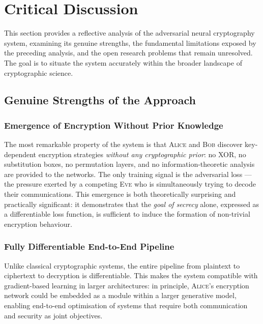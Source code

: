 \documentclass[12pt, a4paper]{article}
\newcommand{\alice}{\textsc{Alice}}
\newcommand{\bob}{\textsc{Bob}}
\newcommand{\eve}{\textsc{Eve}}
\begin{document}
\newpage
\section{Critical Discussion}
\label{sec:discussion}

This section provides a reflective analysis of the adversarial neural
cryptography system, examining its genuine strengths, the fundamental
limitations exposed by the preceding analysis, and the open research
problems that remain unresolved. The goal is to situate the system
accurately within the broader landscape of cryptographic science.

\subsection{Genuine Strengths of the Approach}
\label{subsec:strengths}

\subsubsection*{Emergence of Encryption Without Prior Knowledge}

The most remarkable property of the system is that \alice{} and \bob{}
discover key-dependent encryption strategies \emph{without any
cryptographic prior}: no XOR, no substitution boxes, no permutation
layers, and no information-theoretic analysis are provided to the
networks. The only training signal is the adversarial loss --- the
pressure exerted by a competing \eve{} who is simultaneously trying
to decode their communications. This emergence is both theoretically
surprising and practically significant: it demonstrates that the
\emph{goal of secrecy} alone, expressed as a differentiable loss
function, is sufficient to induce the formation of non-trivial
encryption behaviour.

\subsubsection*{Fully Differentiable End-to-End Pipeline}

Unlike classical cryptographic systems, the entire pipeline from
plaintext to ciphertext to decryption is differentiable. This
makes the system compatible with gradient-based learning in larger
architectures: in principle, \alice{}'s encryption network could
be embedded as a module within a larger generative model, enabling
end-to-end optimisation of systems that require both communication
and security as joint objectives.
\end{document}
